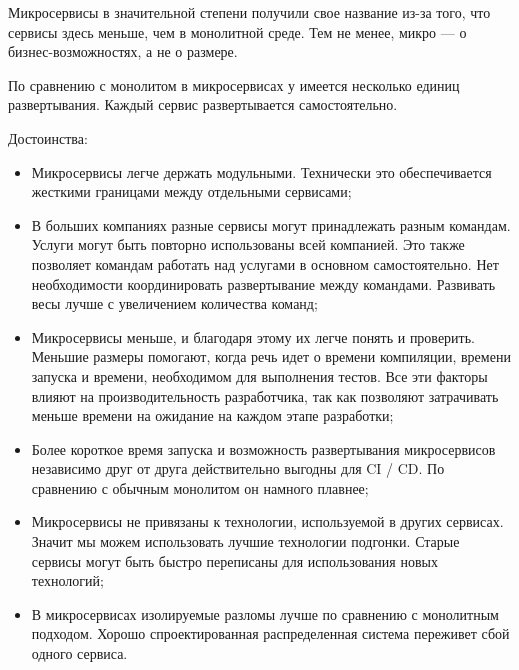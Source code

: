 Микросервисы в значительной степени получили свое название из-за того, что сервисы здесь меньше, чем в монолитной среде. Тем не менее, микро — о бизнес-возможностях, а не о размере.

По сравнению с монолитом в микросервисах у имеется несколько единиц развертывания. Каждый сервис развертывается самостоятельно.

Достоинства:
\begin{itemize}
    \item Микросервисы легче держать модульными. Технически это обеспечивается жесткими границами между отдельными сервисами;
    \item В больших компаниях разные сервисы могут принадлежать разным командам.
    Услуги могут быть повторно использованы всей компанией.
    Это также позволяет командам работать над услугами в основном самостоятельно.
    Нет необходимости координировать развертывание между командами.
    Развивать весы лучше с увеличением количества команд;
    \item Микросервисы меньше, и благодаря этому их легче понять и проверить.
    Меньшие размеры помогают, когда речь идет о времени компиляции, времени запуска и времени, необходимом для выполнения тестов.
    Все эти факторы влияют на производительность разработчика, так как позволяют затрачивать меньше времени на ожидание на каждом этапе разработки;
    \item Более короткое время запуска и возможность развертывания микросервисов независимо друг от друга действительно выгодны для CI / CD.
    По сравнению с обычным монолитом он намного плавнее;
    \item Микросервисы не привязаны к технологии, используемой в других сервисах.
    Значит мы можем использовать лучшие технологии подгонки.
    Старые сервисы могут быть быстро переписаны для использования новых технологий;
    \item В микросервисах изолируемые разломы лучше по сравнению с монолитным подходом.
    Хорошо спроектированная распределенная система переживет сбой одного сервиса.
\end{itemize}

